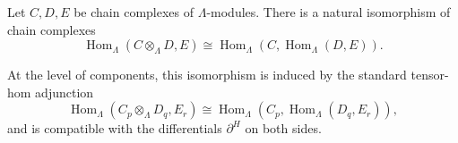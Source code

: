 Let $C, D, E$ be chain complexes of $\Lambda$-modules. There is a natural isomorphism of chain complexes
$$\operatorname{Hom}_{\Lambda}(C \otimes_{\Lambda} D, E) \cong \operatorname{Hom}_{\Lambda}(C, \operatorname{Hom}_{\Lambda}(D, E)).$$

At the level of components, this isomorphism is induced by the standard tensor-hom adjunction
$$\operatorname{Hom}_{\Lambda}(C_p \otimes_{\Lambda} D_q, E_r) \cong \operatorname{Hom}_{\Lambda}(C_p, \operatorname{Hom}_{\Lambda}(D_q, E_r)),$$
and is compatible with the differentials $\partial^H$ on both sides.
